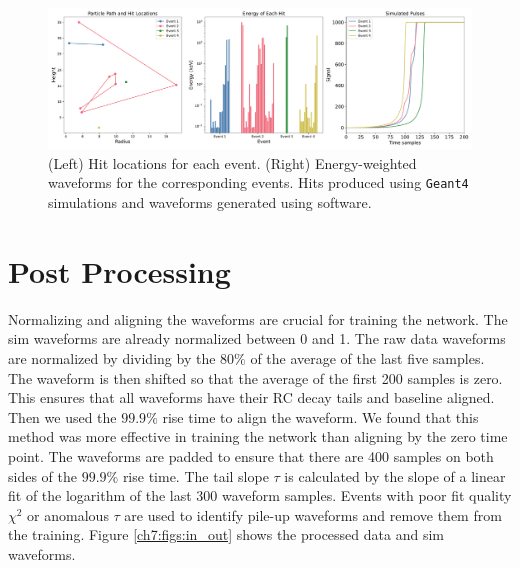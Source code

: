 \begin{figure}[htb!]
    \includegraphics[width=0.99\linewidth,trim={1pc 0pc 1pc 0pc},clip]{ch7/figs/hit_sims.pdf}
    \caption{(Left) Hit locations for each event. (Right) Energy-weighted waveforms for the corresponding events. Hits produced using \texttt{Geant4} simulations and waveforms generated using {\siggen} software.}
   \label{ch7_fig_eng_dep_sim}
\end{figure}


\section{Post Processing}

Normalizing and aligning the waveforms are crucial for training the network. The sim waveforms are already normalized between 0 and 1. The raw data waveforms are normalized by dividing by the $80\%$ of the average of the last five samples. The waveform is then shifted so that the average of the first 200 samples is zero. This ensures that all waveforms have their RC decay tails and baseline aligned. Then we used the $99.9\%$ rise time to align the waveform. We found that this method was more effective in training the network than aligning by the zero time point. The waveforms are padded to ensure that there are 400 samples on both sides of the $99.9\%$ rise time. The tail slope $\tau$ is calculated by the slope of a linear fit of the logarithm of the last 300 waveform samples. Events with poor fit quality $\chi^2$ or anomalous $\tau$ are used to identify pile-up waveforms and remove them from the training. Figure \ref{ch7:figs:in_out} shows the processed data and sim waveforms.

